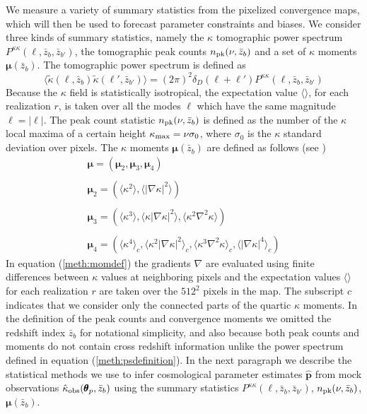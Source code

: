\documentclass[reprint,aps,prd,superscriptaddress,showkeys,showpacs]{revtex4-1}
\newcommand{\bbh}[1]{\mathbf{\hat{#1}}}
\newcommand{\h}[1]{\hat{#1}}
\begin{document}
We measure a variety of summary statistics from the pixelized convergence maps, which will then be used to forecast parameter constraints and biases. We consider three kinds of summary statistics, namely the $\kappa$ tomographic power spectrum $P^{\kappa\kappa}(\ell,\bar{z}_b,\bar{z}_{b'})$, the tomographic peak counts $n_{\rm pk}(\nu,\bar{z}_b)$ and a set of $\kappa$ moments $\pmb{\mu}(\bar{z}_b)$. The tomographic power spectrum is defined as 
\begin{equation}
\langle\tilde{\kappa}(\pmb{\ell},\bar{z}_b)\tilde{\kappa}(\pmb{\ell}',\bar{z}_{b'})\rangle = (2\pi)^2\delta_D(\pmb{\ell}+\pmb{\ell}')P^{\kappa\kappa}(\ell,\bar{z}_b,\bar{z}_{b'})
\end{equation}
%
Because the $\kappa$ field is statistically isotropical, the expectation value $\langle\rangle$, for each realization $r$, is taken over all the modes $\pmb{\ell}$ which have the same magnitude $\ell=\vert\pmb{\ell}\vert$. The peak count statistic $n_{\rm pk}(\nu,\bar{z}_b)$ is defined as the number of the $\kappa$ local maxima of a certain height $\kappa_{\rm max}=\nu\sigma_0$, where $\sigma_0$ is the $\kappa$ standard deviation over pixels. The $\kappa$ moments $\pmb{\mu}(\bar{z}_b)$ are defined as follows (see \citep{Matsubara10,Munshi12,MinkPetri}) 
%
\begin{equation}
\label{meth:momdef}
\begin{matrix}
\pmb{\mu} = (\pmb{\mu}_2,\pmb{\mu}_3,\pmb{\mu}_4) \\ \\
\pmb{\mu}_2 = (\langle\kappa^2\rangle,\langle\vert\nabla\kappa\vert^2\rangle) \\ \\
\pmb{\mu}_3 = (\langle\kappa^3\rangle,\langle\kappa\vert\nabla\kappa\vert^2\rangle,\langle\kappa^2\nabla^2\kappa\rangle) \\ \\
\pmb{\mu}_4 = (\langle\kappa^4\rangle_c,\langle\kappa^2\vert\nabla\kappa\vert^2\rangle_c,\langle\kappa^3\nabla^2\kappa\rangle_c,\langle\vert\nabla\kappa\vert^4\rangle_c)
\end{matrix}
\end{equation}
%
In equation (\ref{meth:momdef}) the gradients $\nabla$ are evaluated using finite differences between $\kappa$ values at neighboring pixels and the expectation values $\langle\rangle$ for each realization $r$ are taken over the $512^2$ pixels in the map. The subscript $c$ indicates that we consider only the connected parts of the quartic $\kappa$ moments. In the definition of the peak counts and convergence moments we omitted the redshift index $\bar{z}_b$ for notational simplicity, and also because both peak counts and moments do not contain cross redshift information unlike the power spectrum defined in equation (\ref{meth:psdefinition}). In the next paragraph we describe the statistical methods we use to infer cosmological parameter estimates $\bbh{p}$ from mock observations $\h{\kappa}_{\rm obs}(\pmb{\theta}_p,\bar{z}_b)$ using the summary statistics $P^{\kappa\kappa}(\ell,\bar{z}_b,\bar{z}_{b'})$, $n_{\rm pk}(\nu,\bar{z}_b)$, $\pmb{\mu}(\bar{z}_b)$.   
\end{document}
